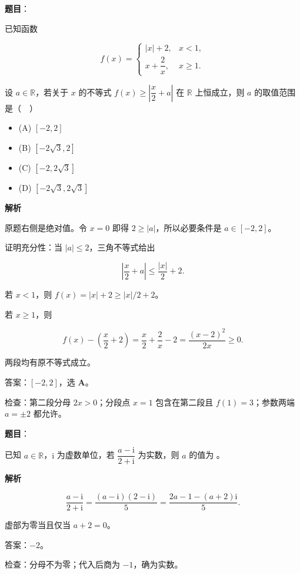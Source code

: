 \begin{answer}

\textbf{题目}：

已知函数

\nopagebreak[4]
\[
f(x)=\begin{cases}|x|+2,&x<1,\\x+\dfrac2x,&x\geqslant1.\end{cases}
\]

设 $a\in\mathbb R$，若关于 $x$ 的不等式 $f(x)\geqslant\left|\dfrac x2+a\right|$ 在 $\mathbb R$ 上恒成立，则 $a$ 的取值范围是（　）

\begin{itemize}
\item (A) $[-2,2]$
\item (B) $[-2\sqrt3,2]$
\item (C) $[-2,2\sqrt3]$
\item (D) $[-2\sqrt3,2\sqrt3]$
\end{itemize}

\textbf{解析}

原题右侧是绝对值。令 $x=0$ 即得 $2\geqslant|a|$，所以必要条件是 $a\in[-2,2]$。

证明充分性：当 $|a|\leqslant2$，三角不等式给出

\nopagebreak[4]
\[\left|\frac x2+a\right|\leqslant\frac{|x|}{2}+2.\]

若 $x<1$，则 $f(x)=|x|+2\geqslant|x|/2+2$。

若 $x\geqslant1$，则

\nopagebreak[4]
\[f(x)-\left(\frac x2+2\right)=\frac x2+\frac2x-2=\frac{(x-2)^2}{2x}\geqslant0.\]

两段均有原不等式成立。

答案：$\boxed{[-2,2]}$，选 \textbf{A}。

检查：第二段分母 $2x>0$；分段点 $x=1$ 包含在第二段且 $f(1)=3$；参数两端 $a=\pm2$ 都允许。


\end{answer}
\begin{answer}

\textbf{题目}：

已知 $a\in\mathbb R$，$\mathrm i$ 为虚数单位，若 $\dfrac{a-\mathrm i}{2+\mathrm i}$ 为实数，则 $a$ 的值为 \gkblank{}。

\textbf{解析}

\nopagebreak[4]
\[\frac{a-\mathrm i}{2+\mathrm i}=\frac{(a-\mathrm i)(2-\mathrm i)}5=\frac{2a-1-(a+2)\mathrm i}{5}.\]

虚部为零当且仅当 $a+2=0$。

答案：$\boxed{-2}$。

检查：分母不为零；代入后商为 $-1$，确为实数。


\end{answer}
